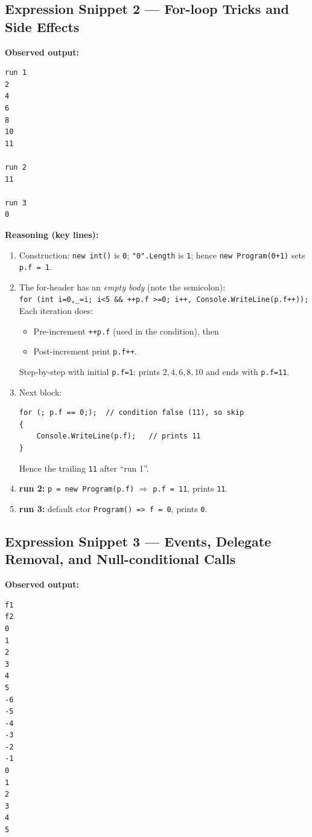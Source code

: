 \subsection*{Expression Snippet 2 — For-loop Tricks and Side Effects}
\textbf{Observed output:}
\begin{verbatim}
run 1
2
4
6
8
10
11

run 2
11

run 3
0
\end{verbatim}

\textbf{Reasoning (key lines):}
\begin{enumerate}
  \item Construction: \verb|new int()| is \verb|0|; \verb|"0".Length| is \verb|1|; hence \verb|new Program(0+1)| sets \verb|p.f = 1|.
  \item The for-header has an \emph{empty body} (note the semicolon):\\
        \verb|for (int i=0,_=i; i<5 && ++p.f >=0; i++, Console.WriteLine(p.f++));|\\
        Each iteration does:
        \begin{itemize}
          \item Pre-increment \verb|++p.f| (used in the condition), then
          \item Post-increment print \verb|p.f++|.
        \end{itemize}
        Step-by-step with initial \verb|p.f=1|: prints \(2,4,6,8,10\) and ends with \verb|p.f=11|.
  \item Next block:
\begin{verbatim}
for (; p.f == 0;);  // condition false (11), so skip
{
    Console.WriteLine(p.f);   // prints 11
}
\end{verbatim}
        Hence the trailing \verb|11| after ``run 1''.
  \item \textbf{run 2:} \verb|p = new Program(p.f)| $\Rightarrow$ \verb|p.f = 11|, prints \verb|11|.
  \item \textbf{run 3:} default ctor \verb|Program() => f = 0|, prints \verb|0|.
\end{enumerate}

\subsection*{Expression Snippet 3 — Events, Delegate Removal, and Null-conditional Calls}
\textbf{Observed output:}
\begin{verbatim}
f1
f2
0
1
2
3
4
5
-6
-5
-4
-3
-2
-1
0
1
2
3
4
5
\end{verbatim}

